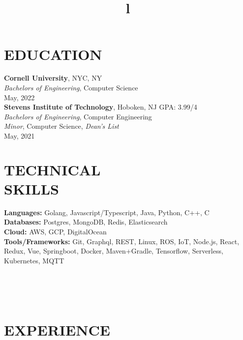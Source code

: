 \documentclass[margin]{res}
\begin{document}
\begin{resume}


\section{EDUCATION}
\textbf{Cornell University}, NYC, NY\\
{\sl Bachelors of Engineering}, Computer Science\\
May, 2022\\
\textbf{Stevens Institute of Technology}, Hoboken, NJ \hfill GPA: 3.99/4\\
{\sl Bachelors of Engineering}, Computer Engineering\\
{\sl Minor}, Computer Science, {\sl Dean's List}\\
May, 2021

\section{TECHNICAL\\SKILLS}

\textbf{Languages:} Golang, Javascript/Typescript, Java, Python, C++, C
\\
\textbf{Databases:} Postgres, MongoDB, Redis, Elasticsearch
\\
\textbf{Cloud:} AWS, GCP, DigitalOcean
\\
\textbf{Tools/Frameworks:} Git, Graphql, REST, Linux, ROS, IoT, Node.js,
React, Redux, Vue, Springboot, Docker, Maven+Gradle, Tensorflow,
Serverless, Kubernetes, MQTT

\begin{format}
\title{l}\\
\\
\body\\
\end{format}

\section{EXPERIENCE}


\end{resume}
\end{document}
